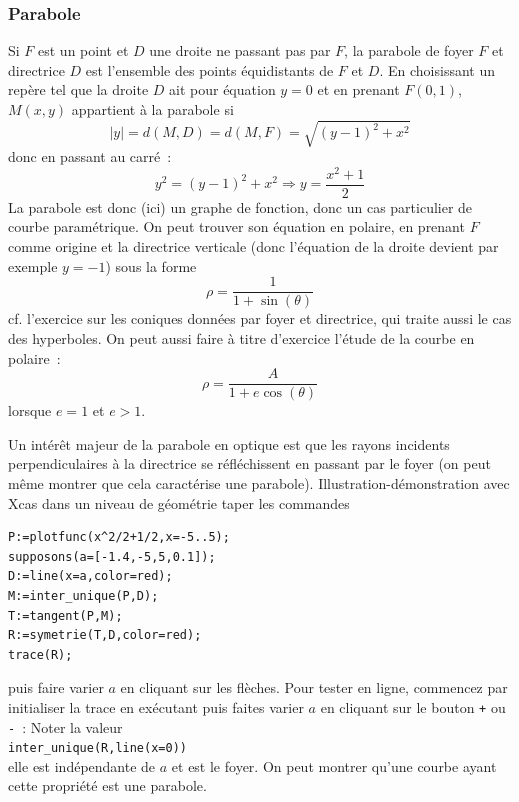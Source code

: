 \documentclass[a4paper,11pt]{article}
\begin{document}
\begin{giacjshere}
\subsubsection{Parabole}
Si $F$ est un point et $D$ une droite ne passant pas par $F$, la
parabole de foyer $F$ et directrice $D$ est l'ensemble des points
\'equidistants de $F$ et $D$.
En choisissant un rep\`ere tel que la droite $D$ ait pour \'equation
$y=0$ et en prenant $F(0,1)$, $M(x,y)$ appartient \`a la parabole
si 
$$|y|=d(M,D)=d(M,F)=\sqrt{(y-1)^2+x^2} $$
donc en passant au carr\'e~:
$$ y^2=(y-1)^2+x^2 \Rightarrow y=\frac{x^2+1}{2}$$
La parabole est donc (ici) un graphe de fonction, donc
un cas particulier de courbe param\'etrique.
On peut trouver son \'equation en polaire,
en prenant $F$ comme origine et la directrice
verticale (donc l'\'equation de la droite
devient par exemple $y=-1$) sous la forme
$$ \rho=\frac{1}{1+\sin(\theta)}$$
cf. l'exercice sur les coniques donn\'ees par foyer et directrice,
qui traite aussi le cas des hyperboles. On peut aussi faire \`a
titre d'exercice l'\'etude de la courbe en polaire~:
\[ \rho = \frac{A}{1+e\cos(\theta)}\]
lorsque $e=1$ et $e>1$.

Un int\'er\^et majeur de la parabole en optique est que
les rayons incidents perpendiculaires \`a la directrice
se r\'efl\'echissent en passant par le
foyer (on peut m\^eme montrer que cela caract\'erise
une parabole). Illustration-d\'emonstration
avec Xcas dans un niveau de g\'eom\'etrie taper les commandes
\begin{verbatim}
P:=plotfunc(x^2/2+1/2,x=-5..5);
supposons(a=[-1.4,-5,5,0.1]);
D:=line(x=a,color=red);
M:=inter_unique(P,D);
T:=tangent(P,M);
R:=symetrie(T,D,color=red);
trace(R);
\end{verbatim}
puis faire varier $a$ en cliquant sur les fl\`eches. Pour tester en
ligne, commencez par initialiser la trace en ex\'ecutant
puis faites varier $a$ en cliquant sur le bouton \verb|+| ou \verb|-|~: 
Noter la valeur\\ \verb|inter_unique(R,line(x=0))|\\
elle est ind\'ependante de $a$ et est le foyer. On peut
montrer qu'une courbe ayant cette propri\'et\'e est
une parabole.
 

\end{giacjshere}
\end{document}
